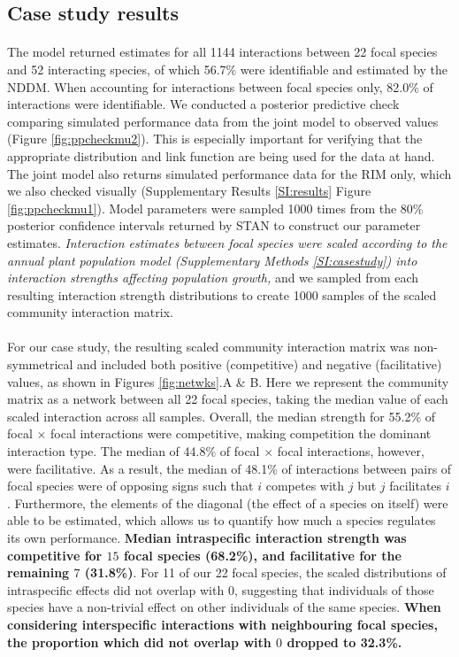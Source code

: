 \documentclass[a4,12pt]{article}
\begin{document}
\begin{refsection}
    \subsection{Case study results}

    \paragraph{}
    The model returned estimates for all 1144 interactions between 22 focal species and 52 interacting species, of which 56.7\% were identifiable and estimated by the NDDM. When accounting for interactions between focal species only, 82.0\% of interactions were identifiable. We conducted a posterior predictive check comparing simulated performance data from the joint model to observed values (Figure \ref{fig:ppcheckmu2}). This is especially important for verifying that the appropriate distribution and link function are being used for the data at hand. The joint model also returns simulated performance data for the RIM only, which we also checked visually (Supplementary Results \ref{SI:results} Figure \ref{fig:ppcheckmu1}). Model parameters were sampled 1000 times from the 80\% posterior confidence intervals returned by STAN to construct our parameter estimates. \textit{Interaction estimates between focal species were scaled according to the annual plant population model (Supplementary Methods \ref{SI:casestudy}) into interaction strengths affecting population growth,} and we sampled from each resulting interaction strength distributions to create 1000 samples of the scaled community interaction matrix.

    \paragraph{}
    For our case study, the resulting scaled community interaction matrix was non-symmetrical and included both positive (competitive) and negative (facilitative) values, as shown in Figures \ref{fig:netwks}.A \& B. Here we represent the community matrix as a network between all 22 focal species, taking the median value of each scaled interaction across all samples. Overall, the median strength for 55.2\% of focal $\times$ focal interactions were competitive, making competition the dominant interaction type. The median of 44.8\% of focal $\times$ focal interactions, however, were facilitative. As a result, the median of 48.1\% of interactions between pairs of focal species were of opposing signs such that $i$ competes with $j$ but $j$ facilitates $i$. Furthermore, the elements of the diagonal (the effect of a species on itself) were able to be estimated, which allows us to quantify how much a species regulates its own performance. \textbf{Median intraspecific interaction strength was competitive for $15$ focal species (68.2\%), and facilitative for the remaining $7$ (31.8\%)}. For 11 of our 22 focal species, the scaled distributions of intraspecific effects did not overlap with $0$, suggesting that individuals of those species have a non-trivial effect on other individuals of the same species. \textbf{When considering interspecific interactions with neighbouring focal species, the proportion which did not overlap with $0$ dropped to 32.3\%.}


\end{refsection}
\end{document}
